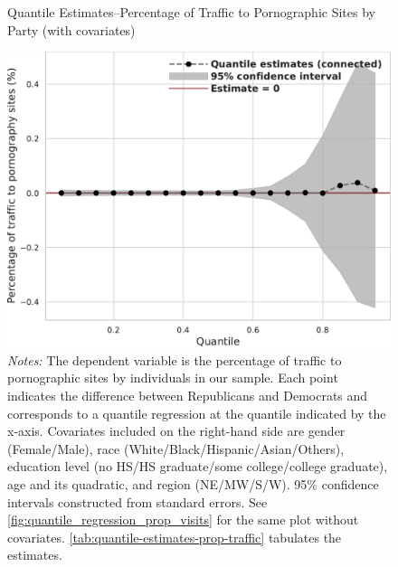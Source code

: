 \documentclass[12pt,twoside]{article}
\begin{document}
\begin{figure}
	\centering
	\caption{Quantile Estimates--Percentage of Traffic to Pornographic Sites by Party (with covariates)}
	\includegraphics[width=.55\linewidth]{figs/quantile_reg_covariates_proportion_visits_adult.pdf}
	\caption*{\footnotesize \emph{Notes:} 
		The dependent variable is the percentage of traffic to pornographic sites by individuals in our sample.
		Each point indicates the difference between Republicans and Democrats and corresponds to a quantile regression at the quantile indicated by the x-axis.
		Covariates included on the right-hand side are gender (Female/Male), race (White/Black/Hispanic/Asian/Others), education level (no HS/HS graduate/some college/college graduate), age and its quadratic, and region (NE/MW/S/W).
		95\% confidence intervals constructed from standard errors.
		See \cref{fig:quantile_regression_prop_visits} for the same plot without covariates.
            \cref{tab:quantile-estimates-prop-traffic} tabulates the estimates.
	}
	\label{fig:quantile_regression_prop_visits_covariates}
\end{figure}
\end{document}
